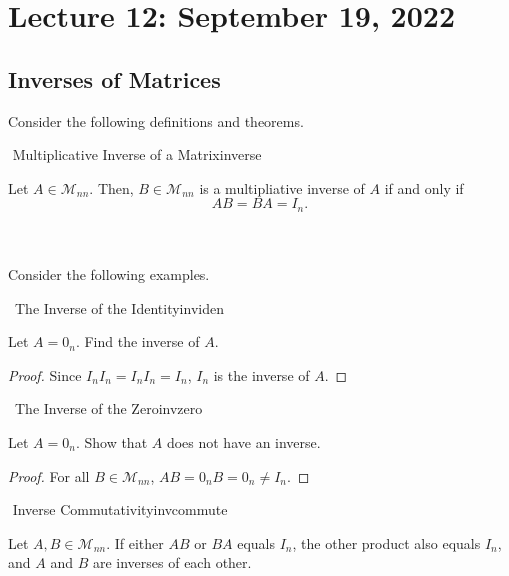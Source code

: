 \pagebreak

\section{Lecture 12: September 19, 2022}

    \subsection{Inverses of Matrices}

        Consider the following definitions and theorems.
        \begin{definition}{\Stop\,\,Multiplicative Inverse of a Matrix}{inverse}

            Let \(A\in\mathcal{M}_{nn}\). Then, \(B\in\mathcal{M}_{nn}\) is a multipliative inverse of \(A\) if and only if 
            \begin{equation*}
                AB=BA=I_n.
            \end{equation*}
            
        \end{definition}
        \vphantom
        \\
        \\
        Consider the following examples.
        \begin{example}{\Difficulty\,\Difficulty\,\,The Inverse of the Identity}{inviden}

            Let \(A=0_n\). Find the inverse of \(A\).
            \begin{proof}
                Since \(I_nI_n=I_nI_n=I_n\), \(I_n\) is the inverse of \(A\).
            \end{proof}
            
        \end{example}
        \begin{example}{\Difficulty\,\Difficulty\,\,The Inverse of the Zero}{invzero}

            Let \(A=0_n\). Show that \(A\) does not have an inverse.
            \begin{proof}
                For all \(B\in\mathcal{M}_{nn}\), \(AB=0_nB=0_n\neq I_n\).
            \end{proof}
            
        \end{example}
        \begin{theorem}{\Stop\,\,Inverse Commutativity}{invcommute}
            
            Let \(A,B\in\mathcal{M}_{nn}\). If either \(AB\) or \(BA\) equals \(I_n\), the other product also equals \(I_n\), and \(A\) and \(B\) are inverses of each other.
            
        \end{theorem}
